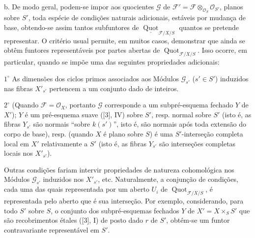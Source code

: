 \documentclass[11pt,twoside,openany]{book}
\numberwithin{equation}{section}
\theoremstyle{plain}
\theoremstyle{definition}
\theoremstyle{remark}
\begin{document}
\medskip
\noindent b. De modo geral, podem-se impor aos quocientes $\mathcal G$ de
$\mathcal F'=\mathcal F\otimes_{\mathcal O_S}\mathcal O_{S'}$, planos sobre
$S'$, toda espécie de condições naturais adicionais, estáveis por mudança de
base, obtendo-se assim tantos subfuntores de
$\underline{\operatorname{Quot}}_{\mathcal F/X/S}$ quantos se pretende
representar. O critério usual permite, em muitos casos, demonstrar que ainda se
obtêm funtores representáveis por partes abertas de
$\operatorname{Quot}_{\mathcal F/X/S}$. Isso ocorre, em particular, quando se
impõe uma das seguintes propriedades adicionais:

\smallskip
\noindent $1^\circ$ As dimensões dos ciclos primos associados aos Módulos
$\mathcal G_{s'}$ ($s'\in S'$) induzidos nas fibras $X'_{s'}$ pertencem a um
conjunto dado de inteiros.

\smallskip
\noindent $2^\circ$ (Quando $\mathcal F=\mathcal O_X$, portanto $\mathcal G$
corresponde a um subpré-esquema fechado $Y$ de $X'$); $Y$ é um pré-esquema
suave ([3], IV) sobre $S'$, resp. normal sobre $S'$ (isto é, as fibras $Y_{s'}$
são normais ``sobre $k(s')$'', isto é, são normais após toda extensão do corpo
de base), resp. (quando $X$ é plano sobre $S$) é uma $S'$-interseção completa
local em $X'$ relativamente a $S'$ (isto é, as fibras $Y_{s'}$ são interseções
completas locais nos $X'_{s'}$).

Outras condições fariam intervir propriedades de natureza cohomológica nos
Módulos $\mathcal G_{s'}$ induzidos nos $X'_{s'}$, etc. Naturalmente, a
conjunção de condições, cada uma das quais representada por um aberto $U_i$ de
$\operatorname{Quot}_{\mathcal F/X/S}$, é representada pelo aberto que é sua
interseção. Por exemplo, considerando, para todo $S'$ sobre $S$, o conjunto dos
subpré-esquemas fechados $Y$ de $X'=X\times_SS'$ que são recobrimentos étales
([3], I) de posto dado $r$ de $S'$, obtém-se um funtor contravariante
representável em $S'$.
\end{document}
